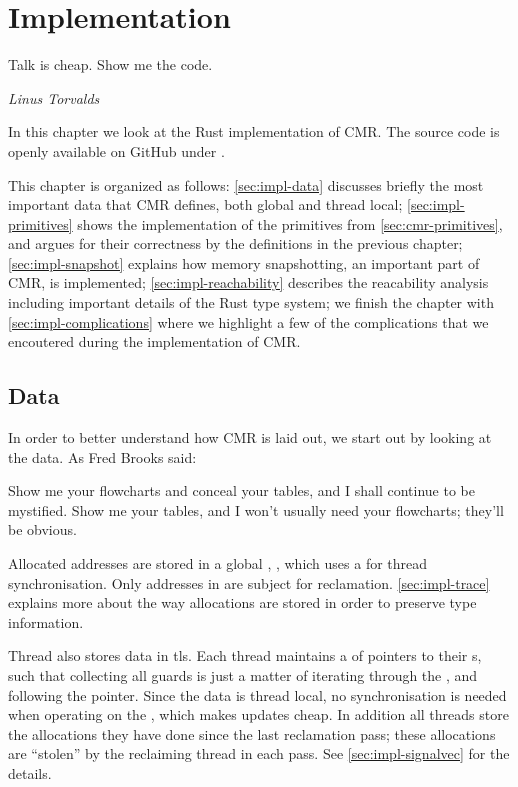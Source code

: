 \chapter{Implementation\label{ch:implementation}}

\epigraph{Talk is cheap. Show me the code.}{\textit{Linus Torvalds}}

In this chapter we look at the Rust implementation of CMR\@. The source code is openly available
on GitHub under \cite{cmr-github}.

This chapter is organized as follows: \cref{sec:impl-data} discusses briefly the most important
data that CMR defines, both global and thread local;
\cref{sec:impl-primitives} shows the implementation of the primitives from
\cref{sec:cmr-primitives}, and argues for their correctness by the definitions in the previous
chapter;
\cref{sec:impl-snapshot} explains how memory snapshotting, an important part of CMR, is
implemented;
\cref{sec:impl-reachability} describes the reacability analysis including important details of the
Rust type system;
we finish the chapter with \cref{sec:impl-complications} where we highlight a few of the
complications that we encoutered during the implementation of CMR.

\clearpage

\section{Data\label{sec:impl-data}}

In order to better understand how CMR is laid out, we start out by looking at the data.
As Fred Brooks\cite{brooks1995mythical} said:
\begin{displayquote}
Show me your flowcharts and conceal your tables, and I shall continue to be mystified. Show me your
  tables, and I won't usually need your flowcharts; they'll be obvious.
\end{displayquote}

Allocated addresses are stored in a global , , which uses a 
for thread synchronisation. Only addresses in  are subject for reclamation.
\cref{sec:impl-trace} explains more about the way allocations are stored in order to preserve type
information.

Thread also stores data in \gls{tls}. Each thread maintains a  of pointers to their
s, such that collecting all guards is just a matter of iterating through the
, and following the pointer. Since the data is thread local, no synchronisation is needed
when operating on the , which makes updates cheap.
In addition all threads store the allocations they have done since the last reclamation pass;
these allocations are ``stolen'' by the reclaiming thread in each pass. See
\cref{sec:impl-signalvec} for the details.

